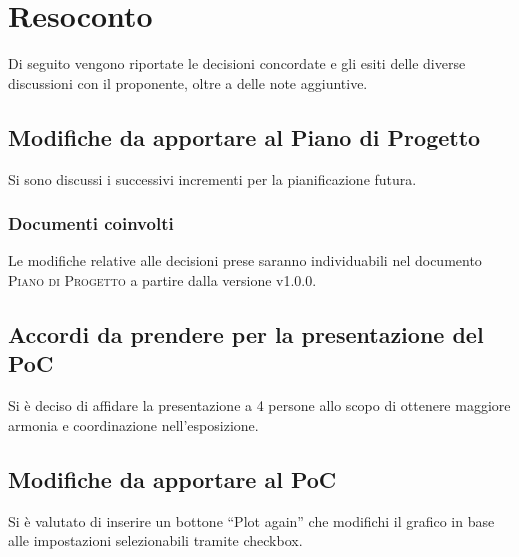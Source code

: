 \documentclass{article}
\begin{document}
\section{Resoconto}
\label{sec:resoconto}

Di seguito vengono riportate le decisioni concordate e gli esiti delle diverse discussioni con il proponente, oltre a
delle note aggiuntive.

\subsection{Modifiche da apportare al Piano di Progetto}
\label{itm:1}

Si sono discussi i successivi incrementi per la pianificazione futura.

\subsubsection*{Documenti coinvolti}
Le modifiche relative alle decisioni prese saranno individuabili nel documento \textsc{Piano di Progetto} a partire
dalla versione v1.0.0.

\subsection{Accordi da prendere per la presentazione del PoC}
\label{itm:2}

Si è deciso di affidare la presentazione a 4 persone allo scopo di ottenere maggiore armonia e coordinazione nell'esposizione.

\subsection{Modifiche da apportare al PoC}
\label{itm:3}

Si è valutato di inserire un bottone “Plot again” che modifichi il grafico in base alle impostazioni selezionabili tramite checkbox.
\end{document}
